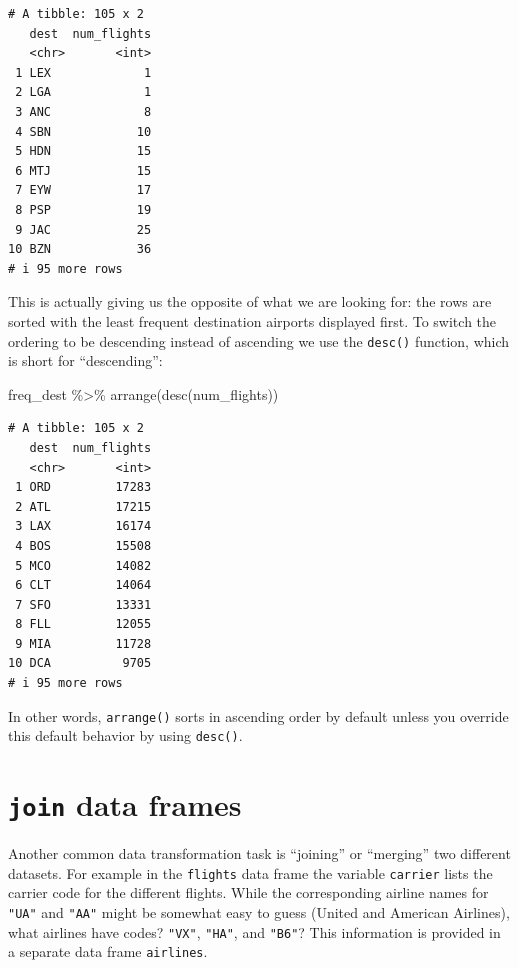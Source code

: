 \documentclass[
  letterpaper,
  DIV=11,
  numbers=noendperiod]{scrreprt}
\newenvironment{Shaded}{\begin{snugshade}}{\end{snugshade}}
\newcommand{\FunctionTok}[1]{\textcolor[rgb]{0.28,0.35,0.67}{#1}}
\newcommand{\NormalTok}[1]{\textcolor[rgb]{0.00,0.23,0.31}{#1}}
\newcommand{\SpecialCharTok}[1]{\textcolor[rgb]{0.37,0.37,0.37}{#1}}
\theoremstyle{definition}
\theoremstyle{remark}
\begin{document}
\begin{verbatim}
# A tibble: 105 x 2
   dest  num_flights
   <chr>       <int>
 1 LEX             1
 2 LGA             1
 3 ANC             8
 4 SBN            10
 5 HDN            15
 6 MTJ            15
 7 EYW            17
 8 PSP            19
 9 JAC            25
10 BZN            36
# i 95 more rows
\end{verbatim}

This is actually giving us the opposite of what we are looking for: the
rows are sorted with the least frequent destination airports displayed
first. To switch the ordering to be descending instead of ascending we
use the \texttt{desc()} function, which is short for ``descending'':

\begin{Shaded}
\begin{Highlighting}[]
\NormalTok{freq\_dest }\SpecialCharTok{\%\textgreater{}\%} 
  \FunctionTok{arrange}\NormalTok{(}\FunctionTok{desc}\NormalTok{(num\_flights))}
\end{Highlighting}
\end{Shaded}

\begin{verbatim}
# A tibble: 105 x 2
   dest  num_flights
   <chr>       <int>
 1 ORD         17283
 2 ATL         17215
 3 LAX         16174
 4 BOS         15508
 5 MCO         14082
 6 CLT         14064
 7 SFO         13331
 8 FLL         12055
 9 MIA         11728
10 DCA          9705
# i 95 more rows
\end{verbatim}

In other words, \texttt{arrange()} sorts in ascending order by default
unless you override this default behavior by using \texttt{desc()}.

\hypertarget{sec-joins}{%
\section{\texorpdfstring{\texttt{join} data
frames}{join data frames}}\label{sec-joins}}

Another common data transformation task is ``joining'' or ``merging''
two different datasets. For example in the \texttt{flights} data frame
the variable \texttt{carrier} lists the carrier code for the different
flights. While the corresponding airline names for \texttt{"UA"} and
\texttt{"AA"} might be somewhat easy to guess (United and American
Airlines), what airlines have codes? \texttt{"VX"}, \texttt{"HA"}, and
\texttt{"B6"}? This information is provided in a separate data frame
\texttt{airlines}.
\end{document}
